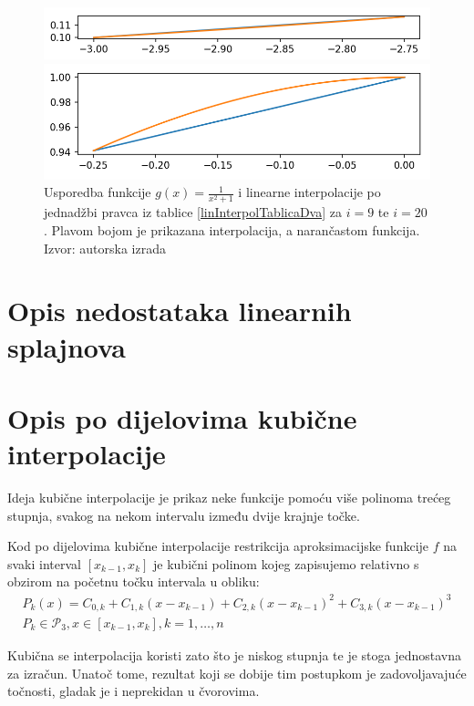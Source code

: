\documentclass[12pt,a4paper]{report}
\begin{document}
			\begin{figure}[H]
				\centering
				
					\includegraphics[width=\textwidth]{slike/usporedba58.png}
				
					\includegraphics[width=\textwidth]{slike/usporedba519.png}
				
				\caption{Usporedba funkcije $g(x)=\frac{1}{x^2 +1}$ i linearne interpolacije po jednadžbi pravca iz tablice \ref{linInterpolTablicaDva} za $i=9$ te $i=20$. Plavom bojom je prikazana interpolacija, a narančastom funkcija. Izvor: autorska izrada}
				\label{linInterSlika2}
			\end{figure}
			
			
			
	\section{Opis nedostataka linearnih splajnova}
	\section{Opis po dijelovima kubične interpolacije}
	Ideja kubične interpolacije je prikaz neke funkcije pomoću više polinoma trećeg stupnja, svakog na nekom intervalu između dvije krajnje točke.
	
	Kod po dijelovima kubične interpolacije restrikcija aproksimacijske funkcije $f$ na svaki interval $[x_{k-1},x_k]$ je kubični polinom kojeg zapisujemo relativno s obzirom na početnu točku intervala u obliku:
	\begin{align*}
		P_k(x)=C_{0,k}+C_{1,k}(x-x_{k-1})+C_{2,k}(x-x_{k-1})^2+C_{3,k}
		(x-x_{k-1})^3\\
		P_k\in \mathcal{P}_3, x\in [x_{k-1}, x_k], k=1,\ldots,n
	\end{align*}
	
	Kubična se interpolacija koristi zato što je niskog stupnja te je stoga jednostavna za izračun. Unatoč tome, rezultat koji se dobije tim postupkom je zadovoljavajuće točnosti, gladak je i neprekidan u čvorovima.
	
\end{document}
